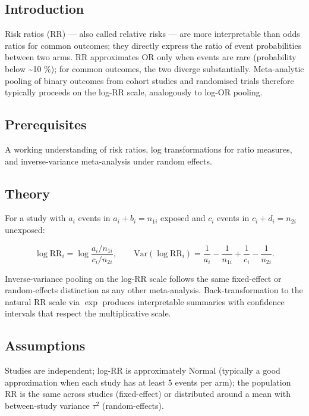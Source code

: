 \documentclass[
]{article}
\author{}
\date{\vspace{-2.5em}}
\begin{document}
\subsection{Introduction}\label{introduction}

Risk ratios (RR) --- also called relative risks --- are more
interpretable than odds ratios for common outcomes; they directly
express the ratio of event probabilities between two arms. RR
approximates OR only when events are rare (probability below
\textasciitilde10 \%); for common outcomes, the two diverge
substantially. Meta-analytic pooling of binary outcomes from cohort
studies and randomised trials therefore typically proceeds on the log-RR
scale, analogously to log-OR pooling.

\subsection{Prerequisites}\label{prerequisites}

A working understanding of risk ratios, log transformations for ratio
measures, and inverse-variance meta-analysis under random effects.

\subsection{Theory}\label{theory}

For a study with \(a_i\) events in \(a_i + b_i = n_{1i}\) exposed and
\(c_i\) events in \(c_i + d_i = n_{2i}\) unexposed:

\[\log \mathrm{RR}_i = \log \frac{a_i / n_{1i}}{c_i / n_{2i}}, \qquad \mathrm{Var}(\log \mathrm{RR}_i) = \frac{1}{a_i} - \frac{1}{n_{1i}} + \frac{1}{c_i} - \frac{1}{n_{2i}}.\]

Inverse-variance pooling on the log-RR scale follows the same
fixed-effect or random-effects distinction as any other meta-analysis.
Back-transformation to the natural RR scale via \(\exp\) produces
interpretable summaries with confidence intervals that respect the
multiplicative scale.

\subsection{Assumptions}\label{assumptions}

Studies are independent; log-RR is approximately Normal (typically a
good approximation when each study has at least 5 events per arm); the
population RR is the same across studies (fixed-effect) or distributed
around a mean with between-study variance \(\tau^2\) (random-effects).
\end{document}
